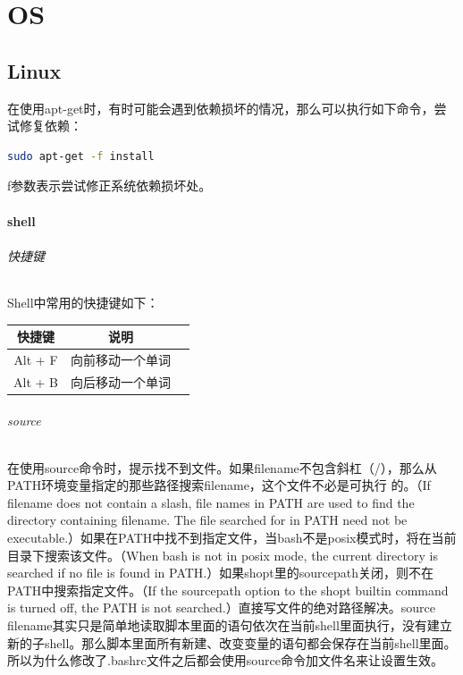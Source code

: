 \documentclass[letter]{book}
\begin{document}
\part{OS}

\chapter{Linux}

在使用apt-get时，有时可能会遇到依赖损坏的情况，那么可以执行如下命令，尝试修复依赖：

\begin{lstlisting}[language=Bash]
sudo apt-get -f install 
\end{lstlisting}

f参数表示尝试修正系统依赖损坏处。

\subsection{shell}

\paragraph{快捷键}

Shell中常用的快捷键如下：

\begin{tabular}{cp{8cm}c}
	\hline
	\multirow{1}{*}{快捷键}
	& \multicolumn{1}{c}{说明}  \\
	\hline			
	Alt + F & 向前移动一个单词 \\
	Alt + B & 向后移动一个单词 \\	
	\hline
\end{tabular}

\paragraph{source}在使用source命令时，提示找不到文件。如果filename不包含斜杠（/），那么从PATH环境变量指定的那些路径搜索filename，这个文件不必是可执行 的。（If filename does not contain a slash, file names in  PATH  are used  to  find the directory containing filename.  The file searched for in PATH need not be executable.）如果在PATH中找不到指定文件，当bash不是posix模式时，将在当前目录下搜索该文件。（When bash is not in posix mode, the current directory is searched if no file is found in PATH.）如果shopt里的sourcepath关闭，则不在PATH中搜索指定文件。（If  the sourcepath  option  to  the shopt builtin command is turned off, the PATH is not searched.）直接写文件的绝对路径解决。source filename其实只是简单地读取脚本里面的语句依次在当前shell里面执行，没有建立新的子shell。那么脚本里面所有新建、改变变量的语句都会保存在当前shell里面。所以为什么修改了.bashrc文件之后都会使用source命令加文件名来让设置生效。
\end{document}

